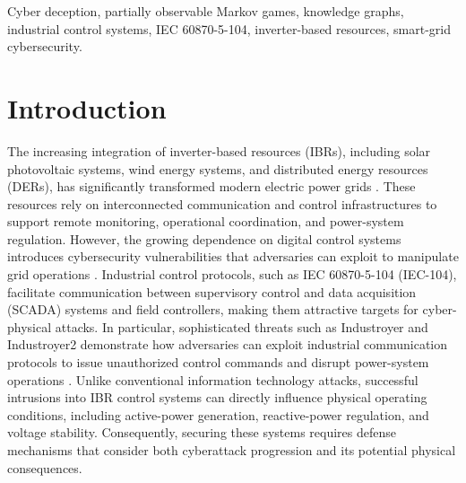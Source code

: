 \documentclass[10pt,conference]{IEEEtran}
\begin{document}
\begin{IEEEkeywords}
Cyber deception, partially observable Markov games, knowledge graphs, industrial control systems, IEC 60870-5-104, inverter-based resources, smart-grid cybersecurity.
\end{IEEEkeywords}

\section{Introduction}
\label{sec:introduction}

The increasing integration of inverter-based resources (IBRs), including solar photovoltaic systems, wind energy systems, and distributed energy resources (DERs), has significantly transformed modern electric power grids \cite{Tuyen2022IBR}. These resources rely on interconnected communication and control infrastructures to support remote monitoring, operational coordination, and power-system regulation. However, the growing dependence on digital control systems introduces cybersecurity vulnerabilities that adversaries can exploit to manipulate grid operations \cite{Zogra2023}. Industrial control protocols, such as IEC 60870-5-104 (IEC-104), facilitate communication between supervisory control and data acquisition (SCADA) systems and field controllers, making them attractive targets for cyber-physical attacks. In particular, sophisticated threats such as Industroyer and Industroyer2 demonstrate how adversaries can exploit industrial communication protocols to issue unauthorized control commands and disrupt power-system operations \cite{mitre2025industroyer2}. Unlike conventional information technology attacks, successful intrusions into IBR control systems can directly influence physical operating conditions, including active-power generation, reactive-power regulation, and voltage stability. Consequently, securing these systems requires defense mechanisms that consider both cyberattack progression and its potential physical consequences.
\end{document}
